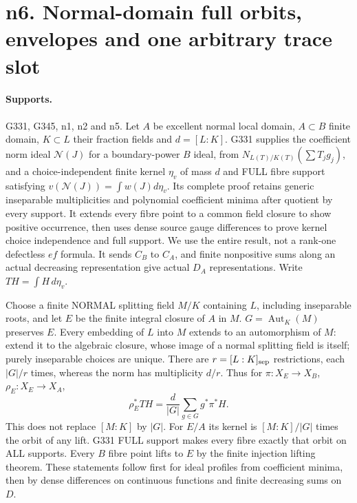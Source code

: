 \section{n6. Normal-domain full orbits, envelopes and one arbitrary trace slot}
\paragraph{Supports.} G331, G345, n1, n2 and n5.
Let $A$ be excellent normal local domain, $A\subset B$ finite domain, $K\subset L$ their fraction fields and $d=[L:K]$. G331 supplies the coefficient norm ideal $\mathcal N(J)$ for a boundary-power $B$ ideal, from $N_{L(T)/K(T)}(\sum T_jg_j)$, and a choice-independent finite kernel $\eta_v$ of mass $d$ and FULL fibre support satisfying
$v(\mathcal N(J))=\int w(J)d\eta_v$. Its complete proof retains generic inseparable multiplicities and polynomial coefficient minima after quotient by every support. It extends every fibre point to a common field closure to show positive occurrence, then uses dense source gauge differences to prove kernel choice independence and full support. We use the entire result, not a rank-one defectless $ef$ formula. It sends $C_B$ to $C_A$, and finite nonpositive sums along an actual decreasing representation give actual $D_A$ representations. Write $TH=\int H\,d\eta_v$.

Choose a finite NORMAL splitting field $M/K$ containing $L$, including inseparable roots, and let $E$ be the finite integral closure of $A$ in $M$. $G=\operatorname{Aut}_K(M)$ preserves $E$. Every embedding of $L$ into $M$ extends to an automorphism of $M$: extend it to the algebraic closure, whose image of a normal splitting field is itself; purely inseparable choices are unique. There are $r=[L:K]_{\rm sep}$ restrictions, each $|G|/r$ times, whereas the norm has multiplicity $d/r$. Thus for $\pi:X_E\to X_B$, $\rho_E:X_E\to X_A$,
\[
 \rho_E^*TH=\frac d{|G|}\sum_{g\in G}g^*\pi^*H. \tag{11}
\]
This does not replace $[M:K]$ by $|G|$. For $E/A$ its kernel is $[M:K]/|G|$ times the orbit of any lift. G331 FULL support makes every fibre exactly that orbit on ALL supports. Every $B$ fibre point lifts to $E$ by the finite injection lifting theorem. These statements follow first for ideal profiles from coefficient minima, then by dense differences on continuous functions and finite decreasing sums on $D$.

